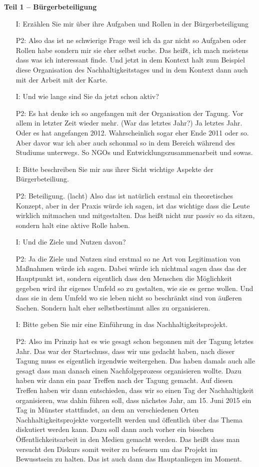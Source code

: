 \textbf{Teil 1 -- B{\"u}rgerbeteiligung}
\begin{itemize}
    \item[I:] Erz{\"a}hlen Sie mir {\"u}ber ihre Aufgaben und Rollen in der B{\"u}rgerbeteiligung
    \item[P2:] Also das ist ne schwierige Frage weil ich da gar nicht so Aufgaben oder Rollen habe sondern mir sie eher selbst suche. Das hei{\ss}t, ich mach meistens dass was ich interessant finde. Und jetzt in dem Kontext halt zum Beispiel diese Organisation des Nachhaltigkeitstages und in dem Kontext dann auch mit der Arbeit mit der Karte.
    \item[I:] Und wie lange sind Sie da jetzt schon aktiv? 
    \item[P2:] Es hat denke ich so angefangen mit der Organisation der Tagung. Vor allem in letzter Zeit wieder mehr. (War das letztes Jahr?) Ja letztes Jahr. Oder es hat angefangen 2012. Wahrscheinlich sogar eher Ende 2011 oder so. Aber davor war ich aber auch schonmal so in dem Bereich w{\"a}hrend des Studiums unterwegs. So NGOs und Entwicklungszusammenarbeit und sowas.
    \item[I:] Bitte beschreiben Sie mir aus ihrer Sicht wichtige Aspekte der B{\"u}rgerbeteiliung.
    \item[P2:] Beteiligung. (lacht) Also das ist nat{\"u}rlich erstmal ein theoretisches Konzept, aber in der Praxis w{\"u}rde ich sagen, ist das wichtige dass die Leute wirklich mitmachen und mitgestalten. Das hei{\ss}t nicht nur passiv so da sitzen, sondern halt eine aktive Rolle haben.
    \item[I:] Und die Ziele und Nutzen davon?
    \item[P2:] Ja die Ziele und Nutzen sind erstmal so ne Art von Legitimation von Ma{\ss}nahmen w{\"u}rde ich sagen. Dabei w{\"u}rde ich nichtmal sagen dass das der Hauptpunkt ist, sondern eigentlich dass den Menschen die M{\"o}glichkeit gegeben wird ihr eigenes Umfeld so zu gestalten, wie sie es gerne wollen. Und dass sie in dem Umfeld wo sie leben nicht so beschr{\"a}nkt sind von {\"a}u{\ss}eren Sachen. Sondern halt eher selbstbestimmt alles zu organisieren.
    \item[I:] Bitte geben Sie mir eine Einf{\"u}hrung in das Nachhaltigkeitsprojekt.
    \item[P2:] Also im Prinzip hat es wie gesagt schon begonnen mit der Tagung letztes Jahr. Das war der Startschuss, dass wir uns gedacht haben, nach dieser Tagung muss es eigentlich irgendwie weitergehen. Das haben damals auch alle gesagt dass man danach einen Nachfolgeprozess organisieren wollte. Dazu haben wir dann ein paar Treffen nach der Tagung gemacht. Auf diesen Treffen haben wir dann entschieden, dass wir so einen Tag der Nachhaltigkeit organisieren, was dahin f{\"u}hren soll, dass n{\"a}chstes Jahr, am 15. Juni 2015 ein Tag in M{\"u}nster stattfindet, an dem an verschiedenen Orten Nachhaltigkeitsprojekte vorgestellt werden und {\"o}ffentlich {\"u}ber das Thema diskutiert werden kann. Dazu soll dann auch vorher ein bisschen {\"O}ffentlichkeitsarbeit in den Medien gemacht werden. Das hei{\ss}t dass man versucht den Diskurs somit weiter zu befeuern um das Projekt im Bewusstsein zu halten. Das ist auch dann das Hauptanliegen im Moment.

\end{itemize}
